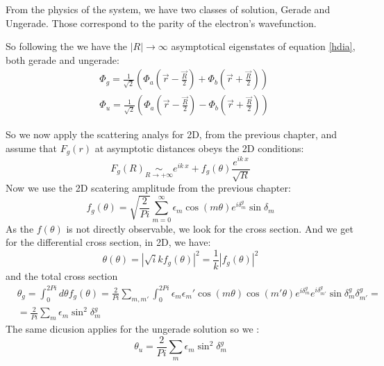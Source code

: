 From the physics of the system, we have two classes of solution, Gerade and Ungerade. Those correspond to the parity of the electron's wavefunction.

So following the \cite{Dalgarno1953} we have the $ |R| \rightarrow \infty $ asymptotical eigenstates of equation \eqref{hdia}, both gerade and ungerade:
\begin{equation}
\begin{split}
  & \Phi_g = \frac{1}{\sqrt{2}}\left(\Phi_a(\vec{r} - \frac{\vec{R}}{2}) + \Phi_b(\vec{r} + \frac{\vec{R}}{2})\right) \\
  & \Phi_u = \frac{1}{\sqrt{2}}\left(\Phi_a(\vec{r} - \frac{\vec{R}}{2}) - \Phi_b(\vec{r} + \frac{\vec{R}}{2})\right) 
\end{split}
\end{equation}

So we now apply the scattering analys for 2D, from the previous chapter, and assume that $ F_g(r) $ at asymptotic distances obeys the 2D conditions:
\begin{equation}
  F_g(R) \underset{R \rightarrow +\infty}{\sim} e^{ik\ x} + f_g(\theta)\frac{e^{ik\ x}}{\sqrt{R}} 
\end{equation}
Now we use the 2D scatering amplitude from the previous chapter:
\begin{equation}\label{fgampl}
  f_g(\theta) = \sqrt{\frac{2}{Pi}}\sum_{m=0}^{\infty}{\epsilon_m \cos(m\theta)e^{i\delta_m^g}\sin\delta_m}
\end{equation}
As the $ f(\theta) $ is not directly observable, we look for the cross section. And we get for the differential cross section, in 2D, we have:
\begin{equation}
  \theta(\theta) = |\sqrt{i}{k}f_g(\theta)|^2 = \frac{1}{k}|f_g(\theta)|^2 
\end{equation}
and the total cross section
\begin{equation}
\begin{split}
  & \theta_g = \int_{0}^{2Pi}{d\theta f_g(\theta)} = \frac{2}{Pi}\sum_{m,m'}\int_{0}^{2Pi}{\epsilon_m\epsilon_m' \cos(m\theta)\cos(m'\theta)e^{i\delta_{m}^g}e^{i\delta_{m'}^g}\sin\delta_m^g\delta_{m'}^g} = \\
  & = \frac{2}{Pi}\sum_{m}{\epsilon_m\sin^2\delta_m^g}
\end{split}
\end{equation}
The same dicusion applies for the ungerade solution so we :
\begin{equation}
  \theta_u = \frac{2}{Pi}\sum_{m}{\epsilon_m\sin^2\delta_m^g}
\end{equation}

